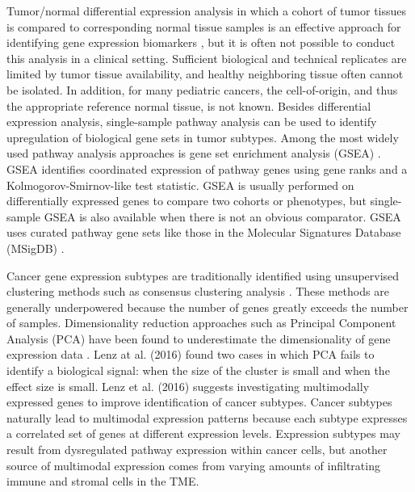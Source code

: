\documentclass[10pt,letterpaper]{article}
\begin{document}
Tumor/normal differential expression analysis in which a cohort of tumor tissues is compared to corresponding normal tissue samples is an effective approach for identifying gene expression biomarkers \cite{andersCountbasedDifferentialExpression2013, andersDifferentialExpressionAnalysis2010, sonesonComparisonMethodsDifferential2013}, but it is often not possible to conduct this analysis in a clinical setting. Sufficient biological and technical replicates are limited by tumor tissue availability, and healthy neighboring tissue often cannot be isolated. In addition, for many pediatric cancers, the cell-of-origin, and thus the appropriate reference normal tissue, is not known. Besides differential expression analysis, single-sample pathway analysis can be used to identify upregulation of biological gene sets in tumor subtypes. Among the most widely used pathway analysis approaches is gene set enrichment analysis (GSEA) \cite{subramanianGeneSetEnrichment2005, moothaPGC1alpharesponsiveGenesInvolved2003}. GSEA identifies coordinated expression of pathway genes using gene ranks and a Kolmogorov-Smirnov-like test statistic. GSEA is usually performed on differentially expressed genes to compare two cohorts or phenotypes, but single-sample GSEA is also available when there is not an obvious comparator. GSEA uses curated pathway gene sets like those in the Molecular Signatures Database (MSigDB) \cite{liberzonMolecularSignaturesDatabase2011}.

Cancer gene expression subtypes are traditionally identified using unsupervised clustering methods such as consensus clustering analysis \cite{oyeladeClusteringAlgorithmsTheir2016,johnM3CMonteCarlo2018,wilkersonConsensusClusterPlusClassDiscovery2010a}. These methods are generally underpowered because the number of genes greatly exceeds the number of samples. Dimensionality reduction approaches such as Principal Component Analysis (PCA) have been found to underestimate the dimensionality of gene expression data \cite{lenzPrincipalComponentsAnalysis2016}. Lenz at al. (2016) found two cases in which PCA fails to identify a biological signal: when the size of the cluster is small and when the effect size is small. Lenz et al. (2016) suggests investigating multimodally expressed genes to improve identification of cancer subtypes. Cancer subtypes naturally lead to multimodal expression patterns because each subtype expresses a correlated set of genes at different expression levels. Expression subtypes may result from dysregulated pathway expression within cancer cells, but another source of multimodal expression comes from varying amounts of infiltrating immune and stromal cells in the TME.
\end{document}
